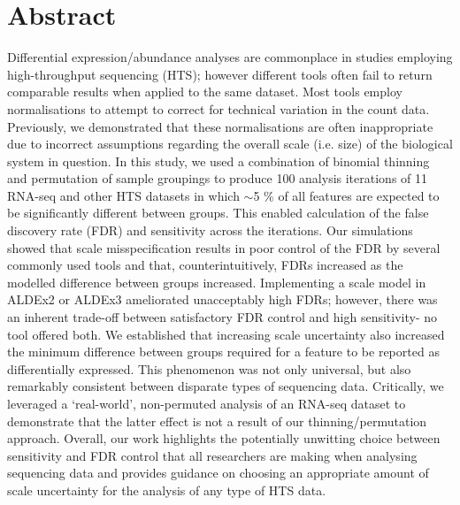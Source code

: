 \documentclass[10pt,letterpaper]{article}
\begin{document}

%
\section*{Abstract}
Differential expression/abundance analyses are commonplace in studies employing high-throughput sequencing (HTS); however different tools often fail to return comparable results when applied to the same dataset. Most tools employ normalisations to attempt to correct for technical variation in the count data. Previously, we demonstrated that these normalisations are often inappropriate due to incorrect assumptions regarding the overall scale (i.e. size) of the biological system in question. In this study, we used a combination of binomial thinning and permutation of sample groupings to produce 100 analysis iterations of 11 RNA-seq and other HTS datasets in which $\sim$5 \% of all features are expected to be significantly different between groups. This enabled calculation of the false discovery rate (FDR) and sensitivity across the iterations. Our simulations showed that scale misspecification results in poor control of the FDR by several commonly used tools and that, counterintuitively, FDRs increased as the modelled difference between groups increased. Implementing a scale model in ALDEx2 or ALDEx3 ameliorated unacceptably high FDRs; however, there was an inherent trade-off between satisfactory FDR control and high sensitivity- no tool offered both. We established that increasing scale uncertainty also increased the minimum difference between groups required for a feature to be reported as differentially expressed. This phenomenon was not only universal, but also remarkably consistent between disparate types of sequencing data. Critically, we leveraged a `real-world’, non-permuted analysis of an RNA-seq dataset to demonstrate that the latter effect is not a result of our thinning/permutation approach. Overall, our work highlights the potentially unwitting choice between sensitivity and FDR control that all researchers are making when analysing sequencing data and provides guidance on choosing an appropriate amount of scale uncertainty for the analysis of any type of HTS data.
\end{document}
